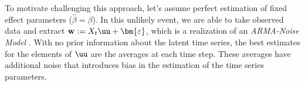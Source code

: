 







To motivate challenging this approach, let's assume perfect estimation of fixed effect parameters ($\hat{\beta} = \beta$). In this unlikely event, we are able to take observed data and extract $\mathbf{w}:=X_t\uu + \bm{\varepsilon}$, which is a realization of an \textit{ARMA-Noise Model} \cite{WongMiller1990}. With no prior information about the latent time series, the best estimates for the elements of $\uu$ are the averages at each time step. These averages have additional noise that introduces bias in the estimation of the time series parameters. 

